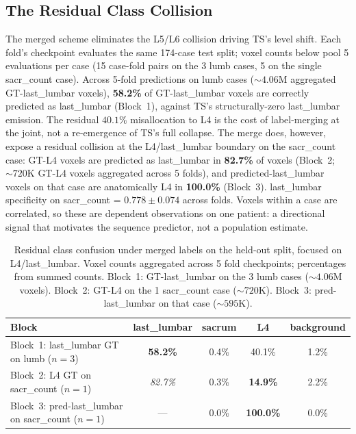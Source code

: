 \documentclass{article}
\newcommand{\sota}{TS}
\begin{document}
\subsection{The Residual Class Collision}
\label{sec:residual}

The merged scheme eliminates the L5/L6 collision driving
\sota{}'s level shift. Each fold's checkpoint
evaluates the same 174-case test split; voxel counts
below pool 5 evaluations per case (15 case-fold pairs on
the 3 lumb cases, 5 on the single sacr\_count case). Across
5-fold predictions on lumb cases (${\sim}4.06$M aggregated
GT-last\_lumbar voxels), \textbf{58.2\%} of
GT-last\_lumbar voxels are correctly predicted as
last\_lumbar (Block~1), against \sota{}'s
structurally-zero last\_lumbar emission. The residual
$40.1\%$ misallocation to L4 is the cost of label-merging
at the joint, not a re-emergence of \sota{}'s full
collapse. The merge does, however, expose a residual
collision at the L4/last\_lumbar boundary on the
sacr\_count case: GT-L4 voxels are predicted as
last\_lumbar in \textbf{82.7\%} of voxels (Block~2;
${\sim}720$K GT-L4 voxels aggregated across 5 folds), and
predicted-last\_lumbar voxels on that case are anatomically
L4 in \textbf{100.0\%} (Block~3). last\_lumbar specificity
on sacr\_count = $0.778 \pm 0.074$ across folds. Voxels
within a case are correlated, so these are dependent
observations on one patient: a directional signal that
motivates the sequence predictor, not a population
estimate.

\begin{table}[t]
\caption{Residual class confusion under merged labels on
the held-out split, focused on L4/last\_lumbar. Voxel
counts aggregated across 5 fold checkpoints; percentages
from summed counts. Block~1: GT-last\_lumbar on the 3 lumb
cases (${\sim}4.06$M voxels). Block~2: GT-L4 on the 1
sacr\_count case (${\sim}720$K). Block~3: pred-last\_lumbar
on that case (${\sim}595$K).}
\label{tab:confusion_blocks}
\centering
\small
\begin{tabular}{lcccc}
\toprule
\bfseries Block & last\_lumbar & sacrum & L4 & background \\
\midrule
Block~1: last\_lumbar GT on lumb ($n{=}3$)         & \textbf{58.2\%} & 0.4\%  & 40.1\%  & 1.2\% \\
Block~2: L4 GT on sacr\_count ($n{=}1$)            & \emph{82.7\%}   & 0.3\%  & \textbf{14.9\%} & 2.2\% \\
Block~3: pred-last\_lumbar on sacr\_count ($n{=}1$) & ---             & 0.0\%  & \textbf{100.0\%} & 0.0\% \\
\bottomrule
\end{tabular}
\end{table}
\end{document}
